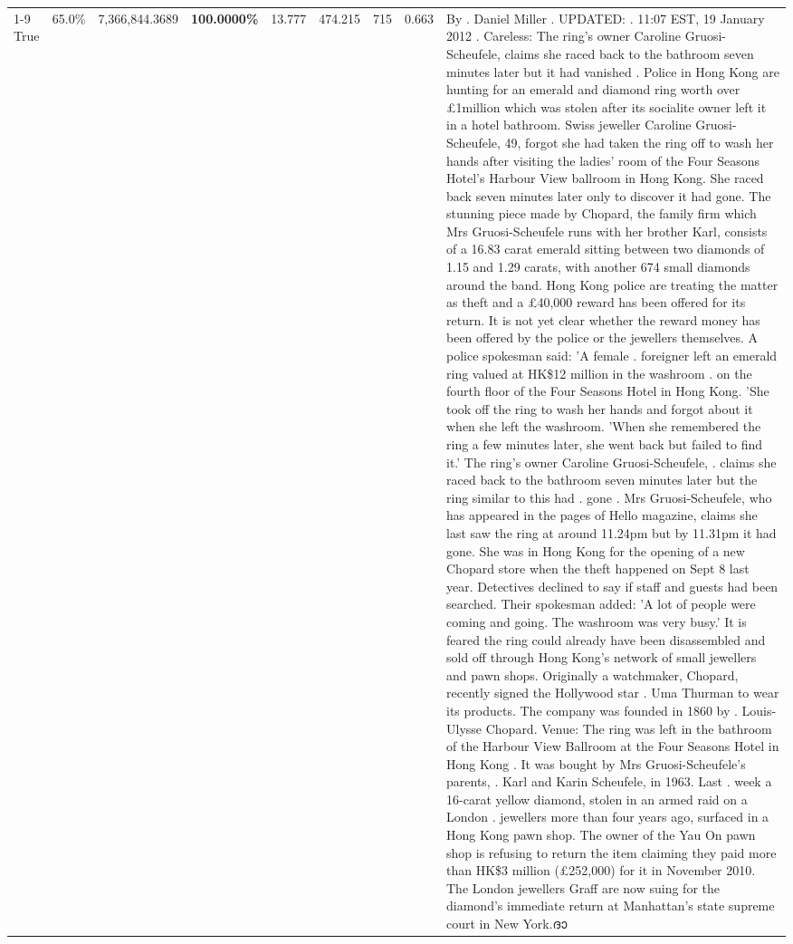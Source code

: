 \begin{table}[H]
\begin{tabular}{lllrlllll}
\cline{1-9}
True & 65.0\% & 7,366,844.3689 & \bfseries \color{red} 100.0000\% & 13.777 & 474.215 & 715 & 0.663 & By . Daniel Miller . UPDATED: . 11:07 EST, 19 January 2012 . Careless: The ring's owner Caroline Gruosi-Scheufele, claims she raced back to the bathroom seven minutes later but it had vanished . Police in Hong Kong are hunting for an emerald and diamond ring worth over £1million which was stolen after its socialite owner left it in a hotel bathroom. Swiss jeweller Caroline Gruosi-Scheufele, 49, forgot she had taken the ring off to wash her hands after visiting the ladies' room of the Four Seasons Hotel's Harbour View ballroom in Hong Kong. She raced back seven minutes later only to discover it had gone. The stunning piece made by Chopard, the family firm which Mrs Gruosi-Scheufele runs with her brother Karl, consists of a 16.83 carat emerald sitting between two diamonds of 1.15 and 1.29 carats, with another 674 small diamonds around the band. Hong Kong police are treating the matter as theft and a £40,000 reward has been offered for its return. It is not yet clear whether the reward money has been offered by the police or the jewellers themselves. A police spokesman said: 'A female . foreigner left an emerald ring valued at HK\$12 million in the washroom . on the fourth floor of the Four Seasons Hotel in Hong Kong. 'She took off the ring to wash her hands and forgot about it when she left the washroom. 'When she remembered the ring a few minutes later, she went back but failed to find it.' The ring's owner Caroline Gruosi-Scheufele, . claims she raced back to the bathroom seven minutes later but the ring similar to this had . gone . Mrs Gruosi-Scheufele, who has appeared in the pages of Hello magazine, claims she last saw the ring at around 11.24pm but by 11.31pm it had gone. She was in Hong Kong for the opening of a new Chopard store when the theft happened on Sept 8 last year. Detectives declined to say if staff and guests had been searched. Their spokesman added: 'A lot of people were coming and going. The washroom was very busy.' It is feared the ring could already have been disassembled and sold off through Hong Kong's network of small jewellers and pawn shops. Originally a watchmaker, Chopard, recently signed the Hollywood star . Uma Thurman to wear its products. The company was founded in 1860 by . Louis-Ulysse Chopard. Venue: The ring was left in the bathroom of the Harbour View Ballroom at the Four Seasons Hotel in Hong Kong . It was bought by Mrs Gruosi-Scheufele's  parents, . Karl and Karin Scheufele, in 1963. Last . week a 16-carat yellow diamond, stolen in an armed raid on a London . jewellers more than four years ago, surfaced in a Hong Kong pawn shop. The owner of the Yau On pawn shop is refusing to return the item claiming they paid more than HK\$3 million (£252,000) for it in November 2010. The London jewellers Graff are now suing for the diamond’s immediate return at Manhattan’s state supreme court in New York.ദാ \\

\end{tabular}
\end{table}
